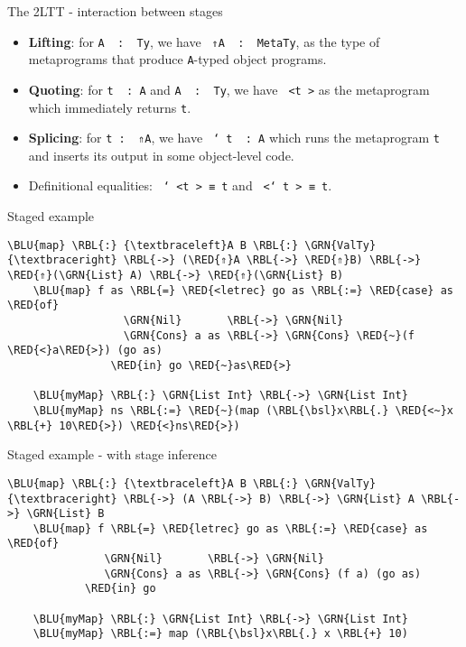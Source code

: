 \documentclass[dvipsnames,aspectratio=169]{beamer}
\newcommand{\ttt}[1]{{\texttt{#1}}}
\theoremstyle{remark}
\newcommand{\RED}[1]{{\color{BrickRed} #1}}
\newcommand{\GRN}[1]{{\color{OliveGreen} #1}}
\newcommand{\RBL}[1]{{\color{RoyalBlue} #1}}
\newcommand{\BLU}[1]{{\color{Blue} #1}}
\newcommand{\bsl}{\textbackslash}
\begin{document}
\begin{frame}[fragile]{The 2LTT - interaction between stages}

\begin{itemize}
\item \textbf{Lifting}: for \ttt{A \RBL{:} \GRN{Ty}}, we have \ttt{\RED{⇑}A \RBL{:} \GRN{MetaTy}}, as the type of
      metaprograms that produce \ttt{A}-typed object programs.
\item \textbf{Quoting}: for \ttt{t \RBL{:} A} and \ttt{A \RBL{:} \GRN{Ty}}, we have \ttt{\RED{<}t\RED{>}} as the metaprogram
      which immediately returns \ttt{t}.
\item \textbf{Splicing}: for \ttt{t : \RED{⇑}A}, we have \ttt{\RED{\char`~}t \RBL{:} A} which runs the
       metaprogram \ttt{t} and inserts its output in some object-level code.
\item Definitional equalities: \ttt{\RED{\char`~<}t\RED{>} ≡ t} and \ttt{\RED{<\char`~}t\RED{>} ≡ t}.
\end{itemize}

\end{frame}

\begin{frame}[fragile]{Staged example}

\begin{Verbatim}[commandchars=\\\{\}]
    \BLU{map} \RBL{:} {\textbraceleft}A B \RBL{:} \GRN{ValTy}{\textbraceright} \RBL{->} (\RED{⇑}A \RBL{->} \RED{⇑}B) \RBL{->} \RED{⇑}(\GRN{List} A) \RBL{->} \RED{⇑}(\GRN{List} B)
    \BLU{map} f as \RBL{=} \RED{<letrec} go as \RBL{:=} \RED{case} as \RED{of}
                  \GRN{Nil}       \RBL{->} \GRN{Nil}
                  \GRN{Cons} a as \RBL{->} \GRN{Cons} \RED{~}(f \RED{<}a\RED{>}) (go as)
                \RED{in} go \RED{~}as\RED{>}

    \BLU{myMap} \RBL{:} \GRN{List Int} \RBL{->} \GRN{List Int}
    \BLU{myMap} ns \RBL{:=} \RED{~}(map (\RBL{\bsl}x\RBL{.} \RED{<~}x \RBL{+} 10\RED{>}) \RED{<}ns\RED{>})
\end{Verbatim}

\end{frame}

\begin{frame}[fragile]{Staged example - with stage inference}

\begin{Verbatim}[commandchars=\\\{\}]
    \BLU{map} \RBL{:} {\textbraceleft}A B \RBL{:} \GRN{ValTy}{\textbraceright} \RBL{->} (A \RBL{->} B) \RBL{->} \GRN{List} A \RBL{->} \GRN{List} B
    \BLU{map} f \RBL{=} \RED{letrec} go as \RBL{:=} \RED{case} as \RED{of}
               \GRN{Nil}       \RBL{->} \GRN{Nil}
               \GRN{Cons} a as \RBL{->} \GRN{Cons} (f a) (go as)
            \RED{in} go

    \BLU{myMap} \RBL{:} \GRN{List Int} \RBL{->} \GRN{List Int}
    \BLU{myMap} \RBL{:=} map (\RBL{\bsl}x\RBL{.} x \RBL{+} 10)
\end{Verbatim}
\end{frame}
\end{document}
